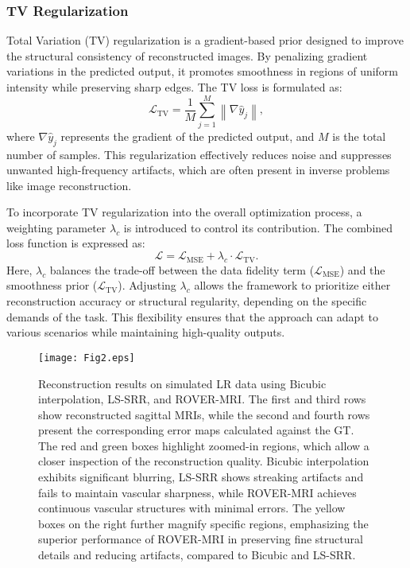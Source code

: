 \documentclass[AMA,STIX2COL]{MRM}
\begin{document}
\subsubsection{TV Regularization}
Total Variation (TV) regularization is a gradient-based prior designed to improve the structural consistency of reconstructed images. By penalizing gradient variations in the predicted output, it promotes smoothness in regions of uniform intensity while preserving sharp edges. The TV loss is formulated as:
\begin{equation}
\mathcal{L}_{\mathrm{TV}}=\frac{1}{M} \sum_{j=1}^M\left\|\nabla \hat{y}_j\right\|,
\end{equation}
where $\nabla \hat{y}_j$ represents the gradient of the predicted output, and $M$ is the total number of samples. This regularization effectively reduces noise and suppresses unwanted high-frequency artifacts, which are often present in inverse problems like image reconstruction.

To incorporate TV regularization into the overall optimization process, a weighting parameter $\lambda_c$ is introduced to control its contribution. The combined loss function is expressed as:
\begin{equation}
\mathcal{L}=\mathcal{L}_{\mathrm{MSE}}+\lambda_c \cdot \mathcal{L}_{\mathrm{TV}}.
\label{eq9}
\end{equation}
Here, $\lambda_c$ balances the trade-off between the data fidelity term ($\mathcal{L}_{\mathrm{MSE}}$) and the smoothness prior ($\mathcal{L}_{\mathrm{TV}}$). Adjusting $\lambda_c$ allows the framework to prioritize either reconstruction accuracy or structural regularity, depending on the specific demands of the task. This flexibility ensures that the approach can adapt to various scenarios while maintaining high-quality outputs. 
%
\begin{figure*}[t]
\centerline{\texttt{[image: Fig2.eps]}}
\caption{Reconstruction results on simulated LR data using Bicubic interpolation, LS-SRR, and ROVER-MRI. The first and third rows show reconstructed sagittal MRIs, while the second and fourth rows present the corresponding error maps calculated against the GT. The red and green boxes highlight zoomed-in regions, which allow a closer inspection of the reconstruction quality. Bicubic interpolation exhibits significant blurring, LS-SRR shows streaking artifacts and fails to maintain vascular sharpness, while ROVER-MRI achieves continuous vascular structures with minimal errors. The yellow boxes on the right further magnify specific regions, emphasizing the superior performance of ROVER-MRI in preserving fine structural details and reducing artifacts, compared to Bicubic and LS-SRR.
}\label{fig2}
\end{figure*}
%
\end{document}
